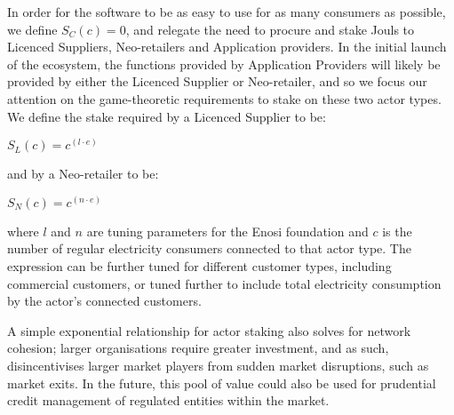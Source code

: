 \documentclass{article}
\theoremstyle{definition}
\theoremstyle{plain} %
\begin{document}
\noindent In order for the software to be as easy to use for as many consumers as possible, we define $S_C(c) = 0$, and relegate the need to procure and stake Jouls to Licenced Suppliers, Neo-retailers and Application providers. In the initial launch of the ecosystem, the functions provided by Application Providers will likely be provided by either the Licenced Supplier or Neo-retailer, and so we focus our attention on the game-theoretic requirements to stake on these two actor types. \\

\noindent We define the stake required by a Licenced Supplier to be: \\

\begin{center}
$S_L(c) = c^{(l \cdot e)}$
\end{center}

\noindent and by a Neo-retailer to be: \\

\begin{center}
$S_N(c) = c^{(n \cdot e)}$
\end{center}

\noindent where $l$ and $n$ are tuning parameters for the Enosi foundation and $c$ is the number of regular electricity consumers connected to that actor type. The expression can be further tuned for different customer types, including commercial customers, or tuned further to include total electricity consumption by the actor's connected customers. \\

\vspace{5mm}

\begin{center}
\end{center}


\vspace{3mm}

\noindent A simple exponential relationship for actor staking also solves for network cohesion; larger organisations require greater investment, and as such, disincentivises larger market players from sudden market disruptions, such as market exits. In the future, this pool of value could also be used for prudential credit management of regulated entities within the market.\\
\end{document}
